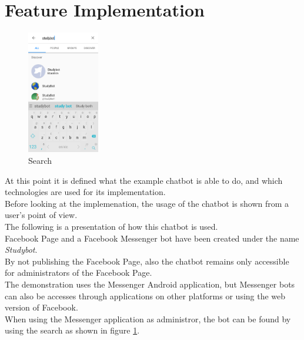 \section{Feature Implementation}
\label{implementation}

\begin{figure}
  \centering
  \includegraphics[width=0.28\textwidth]{images/interface/01-search.png}
	\caption{Search}
	\label{fig:01-search}
\end{figure}

At this point it is defined what the example chatbot is able to do,
and which technologies are used for its implementation.
\\

Before looking at the implemenation,
the usage of the chatbot is shown from a user's point of view.
\\
The following is a presentation of how this chatbot is used.
\\

Facebook Page and a Facebook Messenger bot have been created under the name \emph{Studybot}.
\\
By not publishing the Facebook Page, also the chatbot remains only accessible for administrators of the Facebook Page.
\\

The demonstration uses the Messenger Android application,
but Messenger bots can also be accesses through applications on other platforms
or using the web version of Facebook.
\\

When using the Messenger application as administror,
the bot can be found by using the search as shown in figure \ref{fig:01-search}.
\\

